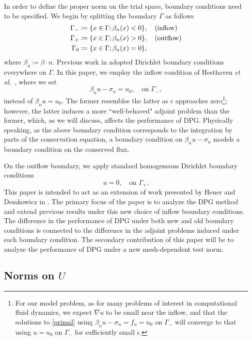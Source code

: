 \documentclass[11pt,onecolumn]{scrartcl}
\newcommand{\Gm}{\Gamma_{-}}
\newcommand{\Gp}{\Gamma_{+}}
\def\etal{{\it et al.~}}
\newcommand{\grad}{\nabla}
\begin{document}
In order to define the proper norm on the trial space, boundary
conditions need to be specified. We begin by splitting the boundary
$\Gamma$ as follows
\begin{align*}
\Gamma_{-} &\coloneqq \{x\in \Gamma; \beta_n(x) < 0\}, \quad {\rm
  (inflow)}\\ \Gamma_{+} &\coloneqq \{x\in \Gamma; \beta_n(x) > 0\},
\quad {\rm (outflow)}\\ \Gamma_{0} &\coloneqq \{x\in \Gamma;
\beta_n(x) = 0\},
\end{align*}
where $\beta_n \coloneqq \beta \cdot n$.
Previous work in \cite{DPGrobustness} adopted Dirichlet boundary
conditions everywhere on $\Gamma$.  
In this paper, we employ the inflow
condition of Hesthaven \etal \cite{Hesthaven96astable}, where we set
\[
\beta_n u - \sigma_n  = u_0, \quad \text{on } \Gm,
\]
instead of $\beta_n u = u_0$. The former resembles the latter as $\epsilon$ approaches zero\footnote{For our model problem, as for many problems of interest in computational fluid dynamics, we expect $\grad u$ to be small near the inflow, and that the solutions to \eqref{primal} using $\beta_n u - \sigma_n = f_n = u_0$ on $\Gamma_-$ will converge to that using $u=u_0$ on $\Gamma_-$  for sufficiently small $\epsilon$.}; however, the latter induces a more ``well-behaved" adjoint problem than the former, which, as we will discuss, affects the performance of DPG. Physically speaking, as the above boundary condition corresponds to the integration by parts of the conservation equation, a boundary condition on $\beta_n u - \sigma_n$ models a boundary condition on the conserved flux.  

On the outflow boundary, we apply standard homogeneous Dirichlet boundary conditions
\[
u = 0, \quad \text{on } \Gp.
\]
This paper is intended to act as an extension of work presented by Heuer and Demkowicz in \cite{DPGrobustness}. The primary focus of the paper is to analyze the DPG method and extend previous results under this new choice of inflow boundary conditions. The difference in the performance of DPG under both new and old boundary conditions is connected to the difference in the adjoint problems induced under each boundary condition. The secondary contribution of this paper will be to analyze the performance of DPG under a new mesh-dependent test norm. 

\subsection{Norms on $U$}
\end{document}
